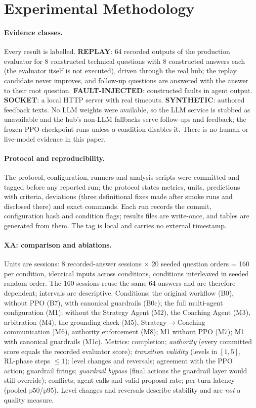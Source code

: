 \section{Experimental Methodology}\label{sec:method}
\paragraph{Evidence classes.} Every result is labelled. \textbf{REPLAY}: 64 recorded outputs of the production evaluator for 8 constructed technical questions with 8 constructed answers each (the evaluator itself is not executed), driven through the real hub; the replay candidate never improves, and follow-up questions are answered with the answer to their root question. \textbf{FAULT-INJECTED}: constructed faults in agent output. \textbf{SOCKET}: a local HTTP server with real timeouts. \textbf{SYNTHETIC}: authored feedback texts. No LLM weights were available, so the LLM service is stubbed as unavailable and the hub's non-LLM fallbacks serve follow-ups and feedback; the frozen PPO checkpoint runs unless a condition disables it. There is no human or live-model evidence in this paper.

\paragraph{Protocol and reproducibility.} The protocol, configuration, runners and analysis scripts were committed and tagged before any reported run; the protocol states metrics, units, predictions with criteria, deviations (three definitional fixes made after smoke runs and disclosed there) and exact commands. Each run records the commit, configuration hash and condition flags; results files are write-once, and tables are generated from them. The tag is local and carries no external timestamp.

\paragraph{XA: comparison and ablations.} Units are sessions: 8 recorded-answer sessions $\times$ 20 seeded question orders = 160 per condition, identical inputs across conditions, conditions interleaved in seeded random order. The 160 sessions reuse the same 64 answers and are therefore dependent; intervals are descriptive. Conditions: the original workflow (B0), without PPO (B7), with canonical guardrails (B0c); the full multi-agent configuration (M1); without the Strategy Agent (M2), the Coaching Agent (M3), arbitration (M4), the grounding check (M5), Strategy$\rightarrow$Coaching communication (M6), authority enforcement (M8); M1 without PPO (M7); M1 with canonical guardrails (M1c). Metrics: completion; \emph{authority} (every committed score equals the recorded evaluator score); \emph{transition validity} (levels in $[1,5]$, RL-phase steps $\le1$); level changes and reversals; agreement with the PPO action; guardrail firings; \emph{guardrail bypass} (final actions the guardrail layer would still override); conflicts; agent calls and valid-proposal rate; per-turn latency (pooled p50/p95). Level changes and reversals describe stability and are \emph{not} a quality measure.

